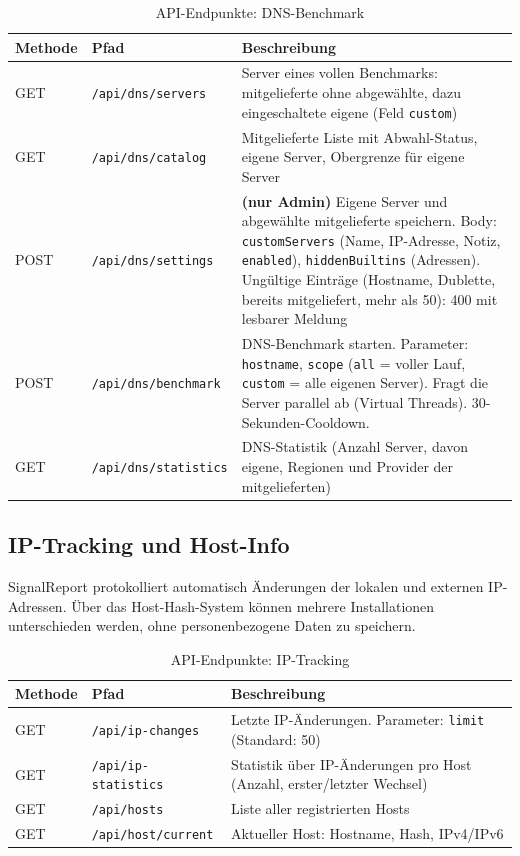 \begin{table}[h]
\centering
\small
\begin{tabular}{|l|l|p{7cm}|}
\hline
\textbf{Methode} & \textbf{Pfad} & \textbf{Beschreibung} \\
\hline
GET & \texttt{/api/dns/servers} & Server eines vollen Benchmarks: mitgelieferte ohne
  abgewählte, dazu eingeschaltete eigene (Feld \texttt{custom}) \\
\hline
GET & \texttt{/api/dns/catalog} & Mitgelieferte Liste mit Abwahl-Status, eigene Server,
  Obergrenze für eigene Server \\
\hline
POST & \texttt{/api/dns/settings} & \textbf{(nur Admin)} Eigene Server und abgewählte mitgelieferte speichern.
  Body: \texttt{customServers} (Name, IP-Adresse, Notiz, \texttt{enabled}),
  \texttt{hiddenBuiltins} (Adressen). Ungültige Einträge (Hostname, Dublette, bereits
  mitgeliefert, mehr als 50): 400 mit lesbarer Meldung \\
\hline
POST & \texttt{/api/dns/benchmark} & DNS-Benchmark starten.
  Parameter: \texttt{hostname}, \texttt{scope} (\texttt{all} = voller Lauf,
  \texttt{custom} = alle eigenen Server).
  Fragt die Server parallel ab (Virtual Threads).
  30-Sekunden-Cooldown. \\
\hline
GET & \texttt{/api/dns/statistics} & DNS-Statistik (Anzahl Server, davon eigene,
  Regionen und Provider der mitgelieferten) \\
\hline
\end{tabular}
\caption{API-Endpunkte: DNS-Benchmark}
\end{table}

\subsection{IP-Tracking und Host-Info}

SignalReport protokolliert automatisch Änderungen der lokalen und externen
IP-Adressen. Über das Host-Hash-System können mehrere Installationen
unterschieden werden, ohne personenbezogene Daten zu speichern.

\begin{table}[h]
\centering
\small
\begin{tabular}{|l|l|p{7cm}|}
\hline
\textbf{Methode} & \textbf{Pfad} & \textbf{Beschreibung} \\
\hline
GET & \texttt{/api/ip-changes} & Letzte IP-Änderungen.
  Parameter: \texttt{limit} (Standard: 50) \\
\hline
GET & \texttt{/api/ip-statistics} & Statistik über IP-Änderungen
  pro Host (Anzahl, erster/letzter Wechsel) \\
\hline
GET & \texttt{/api/hosts} & Liste aller registrierten Hosts \\
\hline
GET & \texttt{/api/host/current} & Aktueller Host: Hostname, Hash, IPv4/IPv6 \\
\hline
\end{tabular}
\caption{API-Endpunkte: IP-Tracking}
\end{table}


